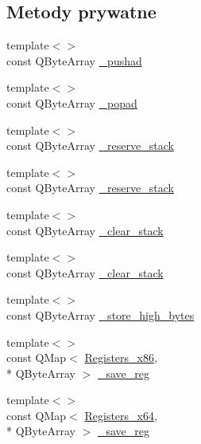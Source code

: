 \subsection*{Metody prywatne}
\begin{DoxyCompactItemize}
\item 
{\footnotesize template$<$$>$ }\\const Q\-Byte\-Array \hyperlink{class_code_defines_a34aa58f224511578f7a44222794c71e9}{\-\_\-pushad}
\item 
{\footnotesize template$<$$>$ }\\const Q\-Byte\-Array \hyperlink{class_code_defines_a36e9965041107536acb66dce63a4572f}{\-\_\-popad}
\item 
{\footnotesize template$<$$>$ }\\const Q\-Byte\-Array \hyperlink{class_code_defines_a6ec53fc0078e8d1c5d33accb8216355d}{\-\_\-reserve\-\_\-stack}
\item 
{\footnotesize template$<$$>$ }\\const Q\-Byte\-Array \hyperlink{class_code_defines_a14730e83bc4015d22fd684a274cbd629}{\-\_\-reserve\-\_\-stack}
\item 
{\footnotesize template$<$$>$ }\\const Q\-Byte\-Array \hyperlink{class_code_defines_a98e2d87a3fdf46dd7626a25087193f80}{\-\_\-clear\-\_\-stack}
\item 
{\footnotesize template$<$$>$ }\\const Q\-Byte\-Array \hyperlink{class_code_defines_a0ad94fda024eb785b29e16bd6c2028ed}{\-\_\-clear\-\_\-stack}
\item 
{\footnotesize template$<$$>$ }\\const Q\-Byte\-Array \hyperlink{class_code_defines_a98aec1ec1640da379c1c0556067ec5f8}{\-\_\-store\-\_\-high\-\_\-bytes}
\item 
{\footnotesize template$<$$>$ }\\const Q\-Map$<$ \hyperlink{codedefines_8h_a0f84efe4ca4d99203713a78bd6e8c82e}{Registers\-\_\-x86}, \\*
Q\-Byte\-Array $>$ \hyperlink{class_code_defines_a44f68942c82b62a45079152e4ba82d2a}{\-\_\-save\-\_\-reg}
\item 
{\footnotesize template$<$$>$ }\\const Q\-Map$<$ \hyperlink{codedefines_8h_a5e15b5c4d766f6faf29b5bcec37bde5c}{Registers\-\_\-x64}, \\*
Q\-Byte\-Array $>$ \hyperlink{class_code_defines_ae677a7a2c2a86955e07ab7f93927c684}{\-\_\-save\-\_\-reg}
\item 

\end{DoxyCompactItemize}
